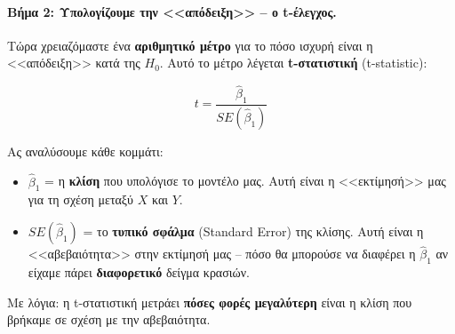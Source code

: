 \documentclass[12pt,a4paper]{article}
\begin{document}
\paragraph{Βήμα 2: Υπολογίζουμε την <<απόδειξη>> -- ο t-έλεγχος.}

Τώρα χρειαζόμαστε ένα \textbf{αριθμητικό μέτρο} για το πόσο ισχυρή είναι η <<απόδειξη>> κατά της $H_0$. Αυτό το μέτρο λέγεται \textbf{t-στατιστική} (t-statistic):

\begin{theorybox}
\begin{equation}
t = \frac{\hat{\beta}_1}{SE(\hat{\beta}_1)}
\end{equation}

Ας αναλύσουμε κάθε κομμάτι:
\begin{itemize}
    \item $\hat{\beta}_1$ = η \textbf{κλίση} που υπολόγισε το μοντέλο μας. Αυτή είναι η <<εκτίμησή>> μας για τη σχέση μεταξύ $X$ και $Y$.
    \item $SE(\hat{\beta}_1)$ = το \textbf{τυπικό σφάλμα} (Standard Error) της κλίσης. Αυτή είναι η <<αβεβαιότητα>> στην εκτίμησή μας -- πόσο θα μπορούσε να διαφέρει η $\hat{\beta}_1$ αν είχαμε πάρει \textbf{διαφορετικό} δείγμα κρασιών.
\end{itemize}

Με λόγια: η t-στατιστική μετράει \textbf{πόσες φορές μεγαλύτερη} είναι η κλίση που βρήκαμε σε σχέση με την αβεβαιότητα.
\end{theorybox}
\end{document}
